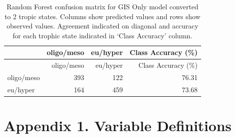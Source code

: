 \documentclass[11pt,]{article}
\begin{document}
\newpage

\begin{longtable}[c]{@{}lrrr@{}}
\caption{Random Forest confusion matrix for GIS Only model converted to
2 tropic states. Columns show predicted values and rows show observed
values. Agreement indicated on diagonal and accuracy for each trophic
state indicated in `Class Accuracy' column.
\label{tab:Confusion_GIS_2}}\tabularnewline
\toprule
& oligo/meso & eu/hyper & Class Accuracy (\%)\tabularnewline
\midrule
\endfirsthead
\toprule
& oligo/meso & eu/hyper & Class Accuracy (\%)\tabularnewline
\midrule
\endhead
oligo/meso & 393 & 122 & 76.31\tabularnewline
eu/hyper & 164 & 459 & 73.68\tabularnewline
\bottomrule
\end{longtable}

\newpage

\section{Appendix 1. Variable
Definitions}\label{appendix-1.-variable-definitions}
\end{document}
